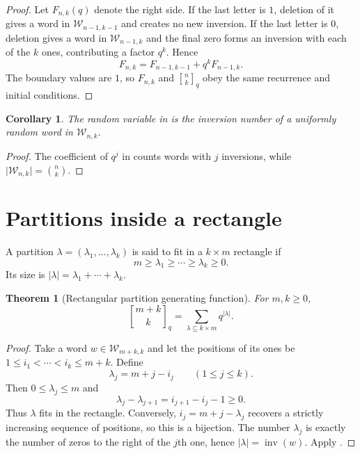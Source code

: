 \documentclass[11pt,oneside,openany]{book}
\newtheorem{theorem}{Theorem}[chapter]
\newtheorem{corollary}[corollary]{Corollary}
\theoremstyle{definition}
\theoremstyle{remark}
\newcommand{\qbinom}[2]{\genfrac{[}{]}{0pt}{}{#1}{#2}_{q}}
\newcommand{\Qbinom}[3]{\genfrac{[}{]}{0pt}{}{#1}{#2}_{#3}}
\newcommand{\inv}{\operatorname{inv}}
\newcommand{\abs}[1]{\lvert #1\rvert}
\begin{document}
\begin{proof}
Let $F_{n,k}(q)$ denote the right side.  If the last letter is $1$, deletion of it gives a word in $\mathcal W_{n-1,k-1}$ and creates no new inversion.  If the last letter is $0$, deletion gives a word in $\mathcal W_{n-1,k}$ and the final zero forms an inversion with each of the $k$ ones, contributing a factor $q^k$.  Hence
\[
 F_{n,k}=F_{n-1,k-1}+q^kF_{n-1,k}.
\]
The boundary values are $1$, so $F_{n,k}$ and $\qbinom nk$ obey the same recurrence and initial conditions.
\end{proof}

\begin{corollary}
The random variable in  is the inversion number of a uniformly random word in $\mathcal W_{n,k}$.
\end{corollary}

\begin{proof}
The coefficient of $q^j$ in  counts words with $j$ inversions, while $\abs{\mathcal W_{n,k}}=\binom nk$.
\end{proof}

\section{Partitions inside a rectangle}

A partition $\lambda=(\lambda_1,\dots,\lambda_k)$ is said to fit in a $k\times m$ rectangle if
\[
 m\ge\lambda_1\ge\cdots\ge\lambda_k\ge0.
\]
Its size is $\abs\lambda=\lambda_1+\cdots+\lambda_k$.

\begin{theorem}[Rectangular partition generating function]\label{thm:rectangle-partitions}
For $m,k\ge0$,
\[
 \Qbinom{m+k}{k}{q}
 =\sum_{\lambda\subseteq k\times m}q^{\abs\lambda}.
\]
\end{theorem}

\begin{proof}
Take a word $w\in\mathcal W_{m+k,k}$ and let the positions of its ones be
\(
 1\le i_1<\cdots<i_k\le m+k.
\)
Define
\[
 \lambda_j=m+j-i_j\qquad(1\le j\le k).
\]
Then $0\le\lambda_j\le m$ and
\[
 \lambda_j-\lambda_{j+1}=i_{j+1}-i_j-1\ge0.
\]
Thus $\lambda$ fits in the rectangle.  Conversely,
\(
 i_j=m+j-\lambda_j
\)
recovers a strictly increasing sequence of positions, so this is a bijection.  The number $\lambda_j$ is exactly the number of zeros to the right of the $j$th one, hence
\(
 \abs\lambda=\inv(w).
\)
Apply .
\end{proof}
\end{document}
